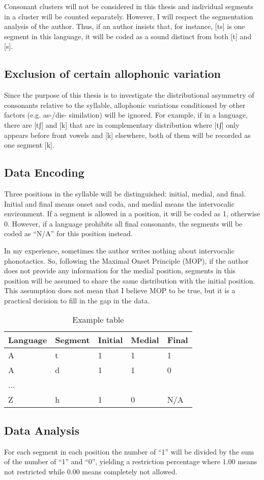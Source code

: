 Consonant clusters will not be considered in this thesis and individual segments in a cluster will be counted separately. However, I will respect the segmentation analysis of the author. Thus, if an author insists that, for instance, [ts] is one segment in this language, it will be coded as a sound distinct from both [t] and [s].

\subsection{Exclusion of certain allophonic variation}

Since the purpose of this thesis is to investigate the distributional asymmetry of consonants relative to the syllable, allophonic variations conditioned by other factors (e.g. as-/dis- similation) will be ignored. For example, if in a language, there are [tʃ] and [k] that are in complementary distribution where [tʃ] only appears before front vowels and [k] elsewhere, both of them will be recorded as one segment [k]. 

\subsection{Data Encoding}

Three positions in the syllable will be distinguishedː initial, medial, and final. Initial and final means onset and coda, and medial means the intervocalic environment. 
If a segment is allowed in a position, it will be coded as 1, otherwise 0. However, if a language prohibits all final consonants, the segments will be coded as ``N/A'' for this position instead.

\par 
In my experience, sometimes the author writes nothing about intervocalic phonotactics. So, following the Maximal Onset Principle (MOP), if the author does not provide any information for the medial position, segments in this position will be assumed to share the same distribution with the initial position. This assumption does not mean that I believe MOP to be true, but it is a practical decision to fill in the gap in the data.

\begin{table}[h]
    \centering
    \begin{tabular}{| l | l | l | l | l |}
    \hline
     Language & Segment & Initial & Medial & Final \\ \hline
	A & t & 1 & 1 & 1 \\ \hline
	A & d & 1 & 1 & 0 \\ \hline
	... &  &  &  &  \\ \hline
	Z & h & 1 & 0 & N/A \\ \hline
    \end{tabular}
    \caption{Example table}
    \label{tab:example}
\end{table}

\subsection{Data Analysis}

For each segment in each position the number of ``1'' will be divided by the sum of the number of ``1'' and ``0'', yielding a restriction percentage where 1.00 means not restricted while 0.00 means completely not allowed. 


